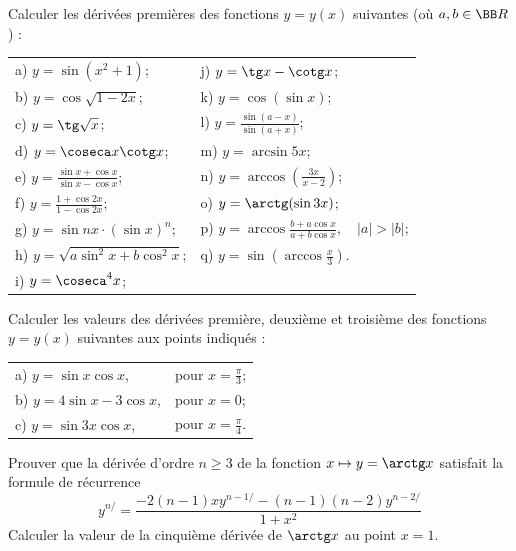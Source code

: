\documentclass[12pt,french,oneside,a4paper]{memoir} %
\begin{document}
\begin{exo}
Calculer les dérivées premières des fonctions $y=y(x)$
  suivantes (où $a, b\in\BB R$) :\\
  
  \begin{tabular}{ll}
  a) $\displaystyle{y=\sin(x^2+1)}$;\qquad\qquad&
  j) $\displaystyle{y=\tg x-\cotg x}$;\\[3mm]
  b) $\displaystyle{y=\cos\sqrt{1-2x}}$;\qquad\qquad&
  k) $\displaystyle{y=\cos(\sin x)}$;\\[3mm]
  c) $\displaystyle{y=\tg \sqrt x}$;\qquad\qquad&
  l) $\displaystyle{y=\frac{\sin(a-x)}{\sin(a+x)}}$;\\[3mm]
  d) $\displaystyle{y=\coseca x\cotg x}$;\qquad\qquad&
  m) $\displaystyle{y=\arcsin 5x}$;\\[3mm]
  e) $\displaystyle{y=\frac{\sin x+\cos x}{\sin x-\cos
  x}}$;\qquad\qquad& 
  n) $\displaystyle{y=\arccos(\frac{3x}{x-2})}$;\\[3mm]
  f) $\displaystyle{y=\frac{1+\cos 2x}{1-\cos 2x}}$;\qquad\qquad&
  o) $\displaystyle{y=\arctg(\sin 3x)}$;\\[3mm]
  g) $\displaystyle{y=\sin nx\cdot(\sin x)^n}$;\qquad\qquad&
  p) $\displaystyle{y=\arccos\frac{b+a\cos x}{a+b\cos
  x},\quad|a|>|b|}$;\\[3mm] 
  h) $\displaystyle{y=\sqrt{a\sin^2x+b\cos^2 x}}$;\qquad\qquad&
  q) $\displaystyle{y=\sin(\arccos\frac{x}{3})}$.\\[3mm]
  i) $\displaystyle{y=\coseca^4x}$;&
  \end{tabular}
\end{exo}
\begin{exo}
Calculer les valeurs des dérivées première, deuxième
  et troisième des fonctions $y=y(x)$ suivantes aux points
  indiqués :\\
  \begin{tabular}{ll}
  a) $\displaystyle{y=\sin x\cos x}$,\qquad\qquad&
  pour \quad $\displaystyle{x=\frac{\pi}{3}}$;\\[3mm]
  b) $\displaystyle{y=4\sin x-3\cos x}$,\qquad\qquad&pour
  \quad$\displaystyle{x=0}$;\\[3mm]
  c) $\displaystyle{y=\sin 3x\cos x}$,\qquad\qquad&pour
  \quad$\displaystyle{x=\frac{\pi}{4}}$.
  \end{tabular}
\end{exo}  
\begin{exo}
Prouver que la dérivée d'ordre $n\geq 3$ de la fonction
 $x\mapsto y=\arctg x$ satisfait la formule de récurrence
 $$
 \displaystyle{y^{n/}=\frac{-2(n-1)xy^{n-1/}-(n-1)(n-2)y^{n-2/}}{1+x^2}}
 $$
Calculer la valeur de la cinquième
 dérivée de $\arctg x$ au point $x=1$.
\end{exo}
\end{document}

